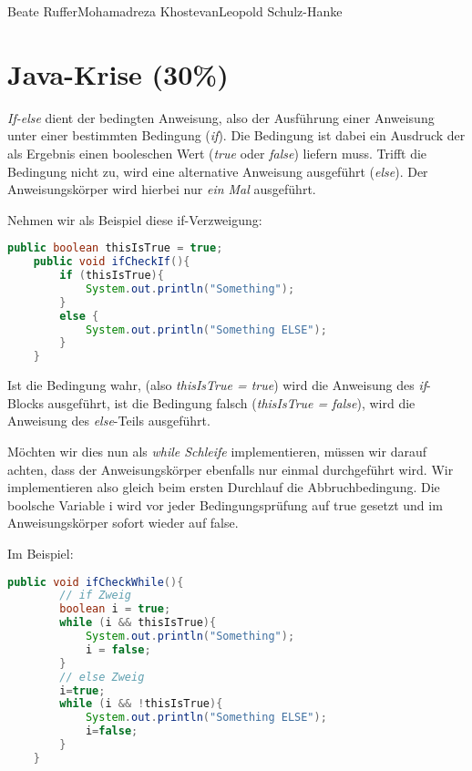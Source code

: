 \documentclass{pi1}
\begin{document}
		{Beate Ruffer}{Mohamadreza Khostevan}{Leopold Schulz-Hanke}

\section{Java-Krise (30\%)}

\emph{If-else} dient der bedingten Anweisung, also der Ausführung einer Anweisung unter einer bestimmten Bedingung (\emph{if}). Die Bedingung ist dabei ein Ausdruck der als Ergebnis einen booleschen Wert (\emph{true} oder \emph{false}) liefern muss. Trifft die Bedingung nicht zu, wird eine alternative Anweisung ausgeführt (\emph{else}). Der Anweisungskörper wird hierbei nur \emph{ein Mal} ausgeführt.

Nehmen wir als Beispiel diese if-Verzweigung:

\begin{lstlisting}[caption={}, firstnumber=1, language=Java]
    public boolean thisIsTrue = true;
    public void ifCheckIf(){
        if (thisIsTrue){
            System.out.println("Something");
        }
        else {
            System.out.println("Something ELSE");
        }
    }
\end{lstlisting}

Ist die Bedingung wahr, (also \emph{thisIsTrue = true}) wird die Anweisung des \emph{if}-Blocks ausgeführt, ist die Bedingung falsch (\emph{thisIsTrue = false}), wird die Anweisung des \emph{else}-Teils ausgeführt.

Möchten wir dies nun als \emph{while Schleife} implementieren, müssen wir darauf achten, dass der Anweisungskörper ebenfalls nur einmal durchgeführt wird. Wir implementieren also gleich beim ersten Durchlauf die Abbruchbedingung. Die boolsche Variable i wird vor jeder Bedingungsprüfung auf true gesetzt und im Anweisungskörper sofort wieder auf false.

Im Beispiel:

\begin{lstlisting}[caption={}, firstnumber=1, language=Java]
public void ifCheckWhile(){
        // if Zweig
        boolean i = true;
        while (i && thisIsTrue){
            System.out.println("Something");
            i = false;
        }
        // else Zweig
        i=true;
        while (i && !thisIsTrue){
            System.out.println("Something ELSE");
            i=false;
        }
    }
\end{lstlisting}
\end{document}

